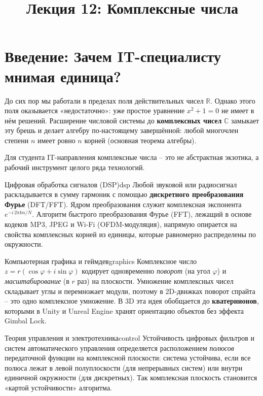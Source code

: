 \documentclass[12pt,a4paper]{article}
\title{Лекция 12: Комплексные числа}
\author{}
\date{}
\begin{document}
\maketitle
\thispagestyle{fancy}

\section*{Введение: Зачем IT-специалисту мнимая единица?}

До сих пор мы работали в пределах поля действительных чисел
$\mathbb{R}$. Однако этого поля оказывается «недостаточно»: уже простое
уравнение $x^2 + 1 = 0$ не имеет в нём решений. Расширение числовой
системы до \textbf{комплексных чисел} $\mathbb{C}$ замыкает эту брешь и
делает алгебру по-настоящему завершённой: любой многочлен степени $n$
имеет ровно $n$ корней (основная теорема алгебры).

Для студента IT-направления комплексные числа -- это не абстрактная
экзотика, а рабочий инструмент целого ряда технологий.

\begin{remarkIT}{Цифровая обработка сигналов (DSP)}{dsp}
  Любой звуковой или радиосигнал раскладывается в сумму гармоник с
  помощью \textbf{дискретного преобразования Фурье} (DFT/FFT). Ядром
  преобразования служит комплексная экспонента $e^{-i\,2\pi kn/N}$.
  Алгоритм быстрого преобразования Фурье (FFT), лежащий в основе
  кодеков MP3, JPEG и Wi-Fi (OFDM-модуляция), напрямую опирается на
  свойства комплексных корней из единицы, которые равномерно
  распределены по окружности.
\end{remarkIT}

\begin{remarkIT}{Компьютерная графика и геймдев}{graphics}
  Комплексное число $z = r(\cos\varphi + i\sin\varphi)$ кодирует
  одновременно \emph{поворот} (на угол $\varphi$) и
  \emph{масштабирование} (в $r$ раз) на плоскости. Умножение
  комплексных чисел складывает углы и перемножает модули, поэтому в
  2D-движках поворот спрайта -- это одно комплексное умножение.
  В 3D эта идея обобщается до \textbf{кватернионов}, которыми в
  Unity и Unreal Engine хранят ориентацию объектов без эффекта
  Gimbal Lock.
\end{remarkIT}

\begin{remarkIT}{Теория управления и электротехника}{control}
  Устойчивость цифровых фильтров и систем автоматического управления
  определяется расположением \emph{полюсов} передаточной функции на
  комплексной плоскости: система устойчива, если все полюса лежат в
  левой полуплоскости (для непрерывных систем) или внутри единичной
  окружности (для дискретных). Так комплексная плоскость становится
  «картой устойчивости» алгоритма.
\end{remarkIT}
\end{document}

